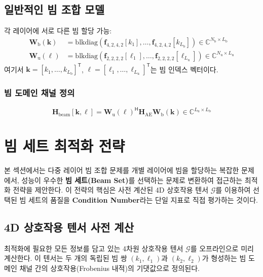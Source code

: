 \documentclass[10pt]{article}
\begin{document}
\subsection{일반적인 빔 조합 모델}
\label{subsec:general_bf_model}

각 레이어에 서로 다른 빔 할당 가능:
\begin{align}
\mathbf{W}_{\text{b}}(\mathbf{k}) &= \text{blkdiag}\left(\mathbf{f}_{4,2,4,2}[k_1], \ldots, \mathbf{f}_{4,2,4,2}[k_{L_{\text{b}}}]\right) \in \mathbb{C}^{N_{\text{b}} \times L_{\text{b}}} \\
\mathbf{W}_{\text{u}}(\boldsymbol{\ell}) &= \text{blkdiag}\left(\mathbf{f}_{2,2,2,2}[\ell_1], \ldots, \mathbf{f}_{2,2,2,2}[\ell_{L_{\text{u}}}]\right) \in \mathbb{C}^{N_{\text{u}} \times L_{\text{u}}}
\end{align}
여기서 $\mathbf{k} = [k_1, \ldots, k_{L_{\text{b}}}]^{\mathsf{T}}$, $\boldsymbol{\ell} = [\ell_1, \ldots, \ell_{L_{\text{u}}}]^{\mathsf{T}}$는 빔 인덱스 벡터이다.

\subsubsection{빔 도메인 채널 정의}
\begin{equation}
\mathbf{H}_{\text{beam}}[\mathbf{k}, \boldsymbol{\ell}] = \mathbf{W}_{\text{u}}(\boldsymbol{\ell})^{\mathsf{H}} \mathbf{H}_{\text{AE}} \mathbf{W}_{\text{b}}(\mathbf{k}) \in \mathbb{C}^{L_{\text{u}} \times L_{\text{b}}}
\end{equation}

\section{빔 세트 최적화 전략}
\label{sec:beam_set_optimization}

본 섹션에서는 다중 레이어 빔 조합 문제를 개별 레이어에 빔을 할당하는 복잡한 문제에서, 성능이 우수한 \textbf{빔 세트(Beam Set)}를 선택하는 문제로 변환하여 접근하는 최적화 전략을 제안한다. 이 전략의 핵심은 사전 계산된 4D 상호작용 텐서 $\mathcal{G}$를 이용하여 선택된 빔 세트의 품질을 \textbf{Condition Number}라는 단일 지표로 직접 평가하는 것이다.

\subsection{4D 상호작용 텐서 사전 계산}
\label{subsec:precomputation}
최적화에 필요한 모든 정보를 담고 있는 4차원 상호작용 텐서 $\mathcal{G}$를 오프라인으로 미리 계산한다. 이 텐서는 두 개의 독립된 빔 쌍 $(k_1, \ell_1)$과 $(k_2, \ell_2)$가 형성하는 빔 도메인 채널 간의 상호작용(Frobenius 내적)의 기댓값으로 정의된다.
\end{document}

